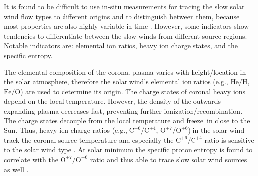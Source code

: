 It is found to be difficult to use in-situ measurements for tracing the slow solar wind flow types to different origins and to distinguish between them, because most properties are also highly variable in time \citep{Kilpua2016}. However, some indicators show tendencies to differentiate between the slow winds from different source regions. Notable indicators are: elemental ion ratios, heavy ion charge states, and the specific entropy.

The elemental composition of the coronal plasma varies with height/location in the solar atmosphere, therefore the solar wind's elemental ion ratios (e.g., $\text{He}/\text{H}$, $\text{Fe}/\text{O}$) are used to determine its origin.
The charge states of coronal heavy ions depend on the local temperature. However, the density of the outwards expanding plasma decreases fast, preventing further ionization/recombination. The charge states decouple from the local temperature and freeze~in close to the Sun. Thus, heavy ion charge ratios (e.g., $\text{C}^{+6}\!/\text{C}^{+4}$, $\text{O}^{+7}\!/\text{O}^{+6}$) in the solar wind track the coronal source temperature and especially the $\text{C}^{+6}\!/\text{C}^{+4}$ ratio is sensitive to the solar wind type \citep{Landi2012}.
At solar minimum the specific proton entropy is found to correlate with the $\text{O}^{+7}\!/\text{O}^{+6}$ ratio and thus able to trace slow solar wind sources as well \citep{Pagel2004}.

